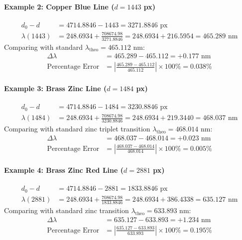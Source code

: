 \documentclass[12pt, a4paper]{article}
\begin{document}
\paragraph{Example 2: Copper Blue Line ($d = 1443$ px)}
\begin{align*}
    d_0 - d &= 4714.8846 - 1443 = 3271.8846\text{ px} \\
    \lambda(1443) &= 248.6934 + \frac{708674.98}{3271.8846} = 248.6934 + 216.5954 = 465.289\text{ nm}
\end{align*}
Comparing with standard $\lambda_{\text{theo}} = 465.112$ nm:
\begin{align*}
    \Delta \lambda &= 465.289 - 465.112 = +0.177\text{ nm} \\
    \text{Percentage Error} &= \left| \frac{465.289 - 465.112}{465.112} \right| \times 100\% = 0.038\%
\end{align*}

\paragraph{Example 3: Brass Zinc Line ($d = 1484$ px)}
\begin{align*}
    d_0 - d &= 4714.8846 - 1484 = 3230.8846\text{ px} \\
    \lambda(1484) &= 248.6934 + \frac{708674.98}{3230.8846} = 248.6934 + 219.3440 = 468.037\text{ nm}
\end{align*}
Comparing with standard zinc triplet transition $\lambda_{\text{theo}} = 468.014$ nm:
\begin{align*}
    \Delta \lambda &= 468.037 - 468.014 = +0.023\text{ nm} \\
    \text{Percentage Error} &= \left| \frac{468.037 - 468.014}{468.014} \right| \times 100\% = 0.005\%
\end{align*}

\paragraph{Example 4: Brass Zinc Red Line ($d = 2881$ px)}
\begin{align*}
    d_0 - d &= 4714.8846 - 2881 = 1833.8846\text{ px} \\
    \lambda(2881) &= 248.6934 + \frac{708674.98}{1833.8846} = 248.6934 + 386.4338 = 635.127\text{ nm}
\end{align*}
Comparing with standard zinc transition $\lambda_{\text{theo}} = 633.893$ nm:
\begin{align*}
    \Delta \lambda &= 635.127 - 633.893 = +1.234\text{ nm} \\
    \text{Percentage Error} &= \left| \frac{635.127 - 633.893}{633.893} \right| \times 100\% = 0.195\%
\end{align*}
\end{document}
